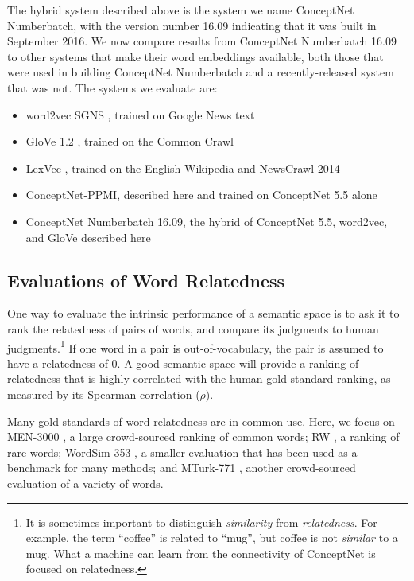 \documentclass[letterpaper]{article}
\begin{document}
The hybrid system described above is the system we name ConceptNet Numberbatch,
with the version number 16.09 indicating that it was built in September 2016.
We now compare results from ConceptNet Numberbatch 16.09 to other systems that
make their word embeddings available, both those that were used in building
ConceptNet Numberbatch and a recently-released system that was not. The systems
we evaluate are:

\begin{itemize}
    \item word2vec SGNS \cite{mikolov2013word2vec}, trained on Google News text
    \item GloVe 1.2 \cite{pennington2014glove}, trained on the Common Crawl
    \item LexVec \cite{salle2016lexvec}, trained on the English Wikipedia and NewsCrawl 2014
    \item ConceptNet-PPMI, described here and trained on ConceptNet 5.5 alone
    \item ConceptNet Numberbatch 16.09, the hybrid of ConceptNet 5.5, word2vec, and GloVe described here
\end{itemize}

\subsection{Evaluations of Word Relatedness}
\label{intrinsic-evaluations}

One way to evaluate the intrinsic performance of a semantic space is to ask it
to rank the relatedness of pairs of words, and compare its judgments to human
judgments.\footnote{It is sometimes important to distinguish \emph{similarity}
from \emph{relatedness}. For example, the term ``coffee'' is related to
``mug'', but coffee is not \emph{similar} to a mug. What a machine can learn
from the connectivity of ConceptNet is focused on relatedness.} If one word in
a pair is out-of-vocabulary, the pair is assumed to have a relatedness of 0. A
good semantic space will provide a ranking of relatedness that is highly
correlated with the human gold-standard ranking, as measured by its Spearman
correlation ($\rho$).

Many gold standards of word relatedness are in common use. Here, we focus on
MEN-3000 \cite{bruni2014men}, a large crowd-sourced ranking of common words; RW
\cite{luong2013rw}, a ranking of rare words; WordSim-353 \cite{finkelstein2001ws},
a smaller evaluation that has been used as a benchmark for many methods; and MTurk-771
\cite{halawi2012mturk}, another crowd-sourced evaluation of a variety of words.
\end{document}
